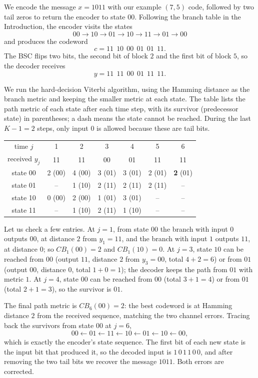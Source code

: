 \begin{example}\label{ex:viterbi}
We encode the message \(x = 1011\) with our example \((7,5)\) code, followed by two tail zeros to return the encoder to state \(00\). Following the branch table in the Introduction, the encoder visits the states
\[00 \to 10 \to 01 \to 10 \to 11 \to 01 \to 00\]
and produces the codeword
\[c = 11\ \ 10\ \ 00\ \ 01\ \ 01\ \ 11.\]
The BSC flips two bits, the second bit of block \(2\) and the first bit of block \(5\), so the decoder receives
\[y = 11\ \ 11\ \ 00\ \ 01\ \ 11\ \ 11.\]

We run the hard-decision Viterbi algorithm, using the Hamming distance as the branch metric and keeping the smaller metric at each state. The table lists the path metric of each state after each time step, with its survivor (predecessor state) in parentheses; a dash means the state cannot be reached. During the last \(K - 1 = 2\) steps, only input \(0\) is allowed because these are tail bits.
\begin{center}
\begin{tabular}{c|cccccc}
\hline
time \(j\) & 1 & 2 & 3 & 4 & 5 & 6 \\
received \(y_j\) & 11 & 11 & 00 & 01 & 11 & 11 \\
\hline
state 00 & 2 (00) & 4 (00) & 3 (01) & 3 (01) & 2 (01) & \textbf{2} (01) \\
state 01 & -- & 1 (10) & 2 (11) & 2 (11) & 2 (11) & -- \\
state 10 & 0 (00) & 2 (00) & 1 (01) & 3 (01) & -- & -- \\
state 11 & -- & 1 (10) & 2 (11) & 1 (10) & -- & -- \\
\hline
\end{tabular}
\end{center}

Let us check a few entries. At \(j=1\), from state \(00\) the branch with input \(0\) outputs \(00\), at distance \(2\) from \(y_1 = 11\), and the branch with input \(1\) outputs \(11\), at distance \(0\); so \(CB_1(00) = 2\) and \(CB_1(10) = 0\). At \(j = 3\), state \(10\) can be reached from \(00\) (output \(11\), distance \(2\) from \(y_3 = 00\), total \(4 + 2 = 6\)) or from \(01\) (output \(00\), distance \(0\), total \(1 + 0 = 1\)); the decoder keeps the path from \(01\) with metric \(1\). At \(j=4\), state \(00\) can be reached from \(00\) (total \(3 + 1 = 4\)) or from \(01\) (total \(2 + 1 = 3\)), so the survivor is \(01\).

The final path metric is \(CB_6(00) = 2\): the best codeword is at Hamming distance \(2\) from the received sequence, matching the two channel errors. Tracing back the survivors from state \(00\) at \(j = 6\),
\[00 \xleftarrow{} 01 \xleftarrow{} 11 \xleftarrow{} 10 \xleftarrow{} 01 \xleftarrow{} 10 \xleftarrow{} 00,\]
which is exactly the encoder's state sequence. The first bit of each new state is the input bit that produced it, so the decoded input is \(1\,0\,1\,1\,0\,0\), and after removing the two tail bits we recover the message \(1011\). Both errors are corrected.


\end{example}

